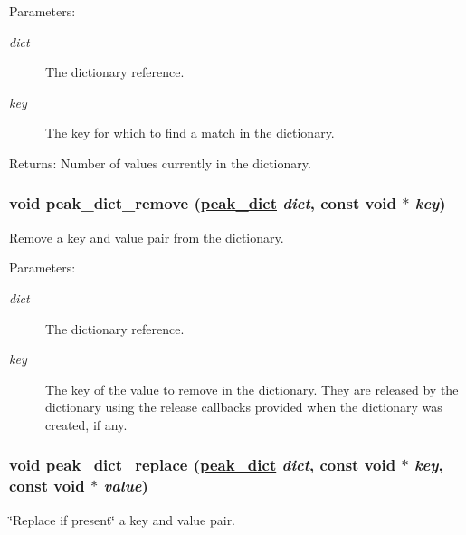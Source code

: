 \begin{Desc}
\item[Parameters:]
\begin{description}
\item[{\em dict}]The dictionary reference. \item[{\em key}]The key for which to find a match in the dictionary.\end{description}
\end{Desc}
\begin{Desc}
\item[Returns:]Number of values currently in the dictionary. \end{Desc}
\hypertarget{group__dict_ga30}{
\subsubsection[peak\_\-dict\_\-remove]{\setlength{\rightskip}{0pt plus 5cm}void peak\_\-dict\_\-remove (\hyperlink{group__dict_ga0}{peak\_\-dict} {\em dict}, const void $\ast$ {\em key})}}
\label{group__dict_ga30}


Remove a key and value pair from the dictionary. 

\begin{Desc}
\item[Parameters:]
\begin{description}
\item[{\em dict}]The dictionary reference. \item[{\em key}]The key of the value to remove in the dictionary. They are released by the dictionary using the release callbacks provided when the dictionary was created, if any. \end{description}
\end{Desc}
\hypertarget{group__dict_ga29}{
\subsubsection[peak\_\-dict\_\-replace]{\setlength{\rightskip}{0pt plus 5cm}void peak\_\-dict\_\-replace (\hyperlink{group__dict_ga0}{peak\_\-dict} {\em dict}, const void $\ast$ {\em key}, const void $\ast$ {\em value})}}
\label{group__dict_ga29}


\char`\"{}Replace if present\char`\"{} a key and value pair. 

